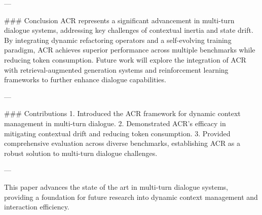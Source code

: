 ---

### Conclusion
ACR represents a significant advancement in multi-turn dialogue systems, addressing key challenges of contextual inertia and state drift. By integrating dynamic refactoring operators and a self-evolving training paradigm, ACR achieves superior performance across multiple benchmarks while reducing token consumption. Future work will explore the integration of ACR with retrieval-augmented generation systems and reinforcement learning frameworks to further enhance dialogue capabilities.

---

### Contributions
1. Introduced the ACR framework for dynamic context management in multi-turn dialogue.
2. Demonstrated ACR's efficacy in mitigating contextual drift and reducing token consumption.
3. Provided comprehensive evaluation across diverse benchmarks, establishing ACR as a robust solution to multi-turn dialogue challenges.

---

This paper advances the state of the art in multi-turn dialogue systems, providing a foundation for future research into dynamic context management and interaction efficiency.